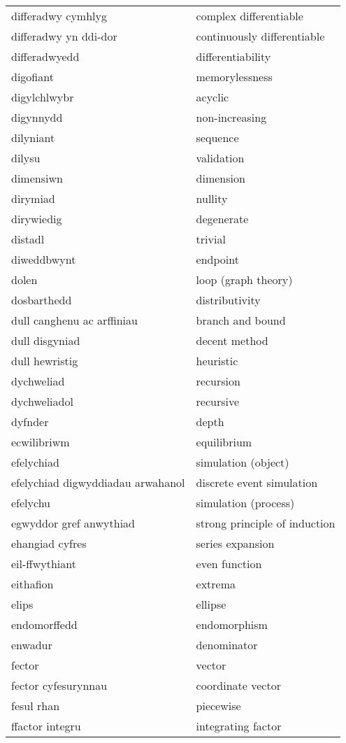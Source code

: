 \begin{supertabular}{p{0.22\textwidth}p{0.22\textwidth}}
differadwy cymhlyg & complex differentiable \\
differadwy yn ddi-dor & continuously differentiable \\
differadwyedd & differentiability \\
digofiant & memorylessness \\
digylchlwybr & acyclic \\
digynnydd & non-increasing \\
dilyniant & sequence \\
dilysu & validation \\
dimensiwn & dimension \\
dirymiad & nullity \\
dirywiedig & degenerate \\
distadl & trivial \\
diweddbwynt & endpoint \\
dolen & loop (graph theory) \\
dosbarthedd & distributivity \\
dull canghenu ac arffiniau & branch and bound \\
dull disgyniad & decent method \\
dull hewristig & heuristic \\
dychweliad & recursion \\
dychweliadol & recursive \\
dyfnder & depth \\
ecwilibriwm & equilibrium \\
efelychiad & simulation (object) \\
efelychiad digwyddiadau arwahanol & discrete event simulation \\
efelychu & simulation (process) \\
egwyddor gref anwythiad & strong principle of induction \\
ehangiad cyfres & series expansion \\
eil-ffwythiant & even function \\
eithafion & extrema \\
elips & ellipse \\
endomorffedd & endomorphism \\
enwadur & denominator \\
fector & vector \\
fector cyfesurynnau & coordinate vector \\
fesul rhan & piecewise \\
ffactor integru & integrating factor \\

\end{supertabular}
